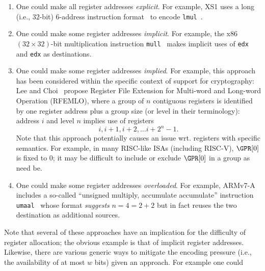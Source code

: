 \documentclass{article}
\begin{document}
\begin{itemize}
      \begin{enumerate}
      \item One could make all  register addresses {\em explicit}.
            For example, XS1 uses a long (i.e., $32$-bit) $6$-address 
            instruction format~\cite[Page 246]{SCARV:XS1:09} 
            to encode
            {\tt lmul}~\cite[Page 146]{SCARV:XS1:09}.
      \item One could make some register addresses {\em implicit}.  
            For example, the x86 $( 32 \times 32 )$-bit multiplication 
            instruction 
            {\tt mull}~\cite[Page 4-144]{SCARV:X86:2a:12} 
            makes implicit uses of {\tt edx} and {\tt edx} as destinations.
      \item One could make some register addresses {\em implied}.
            For example, this approach has been considered within the
            specific context of support for cryptography: 
            Lee and Choi~\cite{SCARV:LeeCho:08} propose Register File
            Extension for Multi-word and Long-word Operation (RFEMLO), 
            where a group of $n$ contiguous registers is identified by 
            one register address plus a group size (or level in their terminology): 
            address $i$ and level $n$ implies use of registers
            \[
            i, i + 1, i + 2, \ldots i + 2^n - 1 .
            \]
            Note that this approach potentially causes an issue wrt.
            registers with specific semantics.  For example, in many
            RISC-like ISAs (including RISC-V), $\GPR[0]$ is fixed to 
            $0$; it may be difficult to include or exclude $\GPR[0]$ 
            in a group as need be.
      \item One could make some register addresses {\em overloaded}.
            For example, ARMv7-A includes a so-called ``unsigned multiply,
            accumulate accumulate'' instruction 
            {\tt umaal}~\cite[Section A8.8.255]{SCARV:ARMv7_M:17} 
            whose format {\em suggests} $n = 4 = 2 + 2$ but in fact 
            reuses the two destination as additional sources.
      \end{enumerate}
      
      \noindent
      Note that several of these approaches have an implication for the
      difficulty of register allocation; the obvious example is that of
      implicit register addresses.  Likewise, there are various generic
      ways to mitigate the encoding pressure (i.e., the availability of 
      at most $w$ bits) given an approach.  For example one could
      

\end{itemize}
\end{document}
